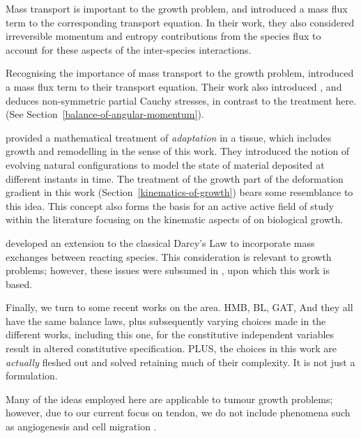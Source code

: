 Mass transport is important to the growth problem, and
\citet{EpsteinMaugin:2000} introduced a mass flux term to the
corresponding transport equation. In their work, they also considered irreversible
momentum and entropy contributions from the species flux to account
for these aspects of the inter-species interactions.

Recognising the importance of mass transport to the
growth problem, introduced a mass flux term
to their transport equation. Their work also introduced , and deduces
non-symmetric partial Cauchy stresses, in contrast to the treatment here. (See
Section~\ref{balance-of-angular-momentum}).

\citet{HumphreyRajagopal:02} provided a
mathematical treatment of \emph{adaptation} in a tissue, which
includes growth and remodelling in the sense of this work. They
introduced the notion of evolving natural configurations to model the
state of material deposited at different instants in time. The
treatment of the growth part of the deformation gradient in this work
(Section~\ref{kinematics-of-growth}) bears some resemblance to this
idea. This concept also forms the basis for an active active field of
study within the literature \citep{Skalak:81,
  SkalakHoger:96, Klischetal:2001, TaberHumphrey:2001,
  LubardaHoger:02, AmbrosiMollica:2002} focusing on the kinematic
aspects of on biological growth.

\citet{PreziosiFarina:2002} developed an extension to the classical
Darcy's Law to incorporate mass exchanges between reacting
species. This consideration is relevant to growth problems; however,
these issues were subsumed in \citet{growthpaper}, upon which this
work is based.

Finally, we turn to some recent works on the area. HMB, BL, GAT, And
they all have the same balance laws, plus subsequently varying choices made in the
different works, including this one, for the constitutive independent
variables result in altered constitutive specification. PLUS, the
choices in this work are {\em actually} fleshed out and solved
retaining much of their complexity. It is not just a formulation.

 Many of the ideas 
employed here are applicable to tumour growth problems; however, due
to our current focus on tendon, we do not include phenomena
such as angiogenesis and cell migration \citep[see for
  example][]{Brewardetal:2003}.

